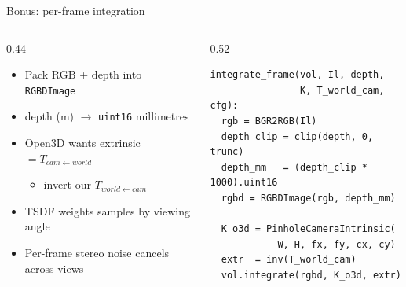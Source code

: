 \documentclass[aspectratio=169,11pt]{beamer}
\newcommand{\code}[1]{\texttt{#1}}
\newcommand{\green}[1]{\textcolor{goodGreen}{#1}}
\begin{document}
\begin{frame}[fragile]{Bonus: per-frame integration}
\begin{columns}[T,totalwidth=\textwidth]
\begin{column}{0.44\textwidth}
\begin{itemize}
    \item Pack RGB + depth into \code{RGBDImage}
    \item depth (m) $\rightarrow$ \code{uint16} millimetres
    \item Open3D wants extrinsic $= T_{cam \leftarrow world}$
    \begin{itemize}
        \item invert our $T_{world \leftarrow cam}$
    \end{itemize}
    \item TSDF weights samples by viewing angle
    \item \green{Per-frame stereo noise cancels across views}
\end{itemize}
\end{column}
\begin{column}{0.52\textwidth}
\scriptsize
\begin{verbatim}
integrate_frame(vol, Il, depth,
                K, T_world_cam, cfg):
  rgb = BGR2RGB(Il)
  depth_clip = clip(depth, 0, trunc)
  depth_mm   = (depth_clip * 1000).uint16
  rgbd = RGBDImage(rgb, depth_mm)

  K_o3d = PinholeCameraIntrinsic(
            W, H, fx, fy, cx, cy)
  extr  = inv(T_world_cam)
  vol.integrate(rgbd, K_o3d, extr)
\end{verbatim}
\end{column}
\end{columns}
\end{frame}
\end{document}
